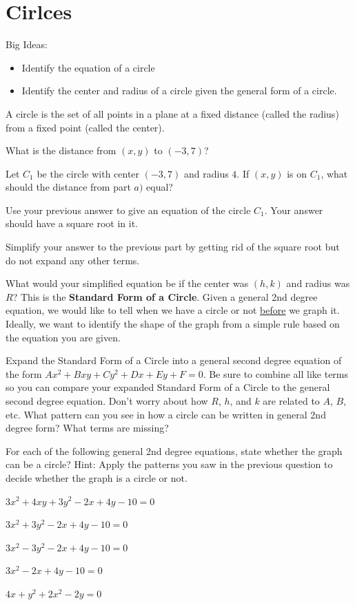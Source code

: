 \section{Cirlces}
Big Ideas:
\begin{itemize}
\item Identify the equation of a circle
\item Identify the center and radius of a circle given the general form of a circle.
\end{itemize}
\begin{info} A circle is the set of all points in a plane at a fixed distance (called the radius) from a fixed point (called the center).
\end{info}
\bq
\be
\item What is the distance from $(x,y)$ to $(-3,7)$?
\item Let $C_1$ be the circle with center $(-3,7)$ and radius $4$. If $(x,y)$ is on $C_1$, what should the distance from part $a)$ equal?
\item Use your previous answer to give an equation of the circle $C_1$. Your answer should have a square root in it.
\item Simplify your answer to the previous part by getting rid of the square root but do not expand any other terms.
\item What would your simplified equation be if the center was $(h,k)$ and radius was $R$? This is the \textbf{Standard Form of a Circle}.
\ee
\eq
Given a general 2nd degree equation, we would like to tell when we have a circle or not \underline{before} we graph it. Ideally, we want to identify the shape of the graph from a simple rule based on the equation you are given.

\bq Expand the Standard Form of a Circle into a general second degree equation of the form $Ax^2+Bxy+Cy^2+Dx+Ey+F=0$. Be sure to combine all like terms so you can compare your expanded Standard Form of a Circle to the general second degree equation. Don't worry about how $R$, $h$, and $k$ are related to $A$, $B$, etc. What pattern can you see in how a circle can be written in general 2nd degree form? What terms are missing?
\eq

\bq For each of the following general 2nd degree equations, state whether the graph can be a circle? Hint: Apply the patterns you saw in the previous question to decide whether the graph is a circle or not.
\be
\item $3x^2+4xy+3y^2-2x+4y-10=0$
\item $3x^2+3y^2-2x+4y-10=0$
\item $3x^2-3y^2-2x+4y-10=0$
\item $3x^2-2x+4y-10=0$
\item $4x+y^2+2x^2-2y=0$
\ee
\eq

